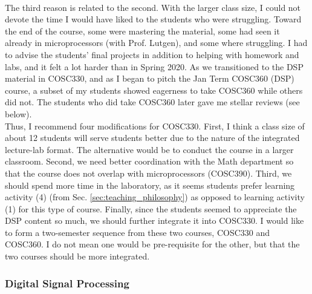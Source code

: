 \documentclass[../../main.tex]{subfiles}
\begin{document}
\\
\vspace{0.15cm}
The third reason is related to the second.  With the larger class size, I could not devote the time I would have liked to the students who were struggling.  Toward the end of the course, some were mastering the material, some had seen it already in microprocessors (with Prof. Lutgen), and some where struggling.  I had to advise the students' final projects in addition to helping with homework and labs, and it felt a lot harder than in Spring 2020.  As we transitioned to the DSP material in COSC330, and as I began to pitch the Jan Term COSC360 (DSP) course, a subset of my students showed eagerness to take COSC360 while others did not.  The students who did take COSC360 later gave me stellar reviews (see below).
\\
\vspace{0.15cm}
Thus, I recommend four modifications for COSC330.  First, I think a class size of about 12 students will serve students better due to the nature of the integrated lecture-lab format.  The alternative would be to conduct the course in a larger classroom.  Second, we need better coordination with the Math department so that the course does not overlap with microprocessors (COSC390).  Third, we should spend more time in the laboratory, as it seems students prefer learning activity (4) (from Sec. \ref{sec:teaching_philosophy}) as opposed to learning activity (1) for this type of course.  Finally, since the students seemed to appreciate the DSP content so much, we should further integrate it into COSC330.  I would like to form a two-semester sequence from these two courses, COSC330 and COSC360.  I do not mean one would be pre-requisite for the other, but that the two courses should be more integrated.

\subsubsection{Digital Signal Processing}
\end{document}
